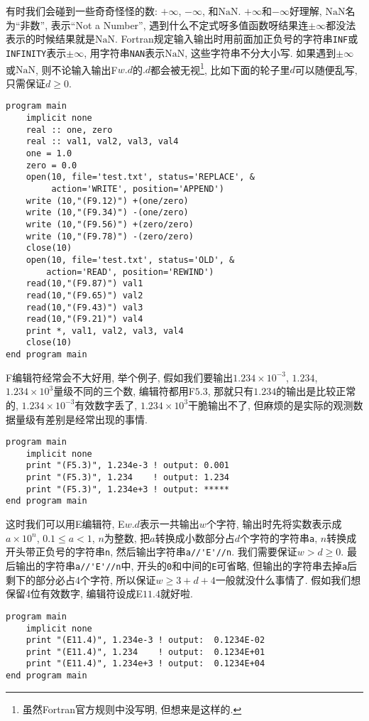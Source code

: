 有时我们会碰到一些奇奇怪怪的数: $+\infty$, $-\infty$, 和$\text{NaN}$. $+\infty$和$-\infty$好理解, $\text{NaN}$名为``非数'', 表示``Not a Number'', 遇到什么不定式呀多值函数呀结果连$\pm\infty$都没法表示的时候结果就是$\text{NaN}$. Fortran规定输入输出时用前面加正负号的字符串\verb|INF|或\verb|INFINITY|表示$\pm\infty$, 用字符串\verb|NAN|表示$\text{NaN}$, 这些字符串不分大小写. 如果遇到$\pm\infty$或$\text{NaN}$, 则不论输入输出F$w.d$的$.d$都会被无视\footnote{虽然Fortran官方规则中没写明, 但想来是这样的.\label{edit_IEEE}}, 比如下面的轮子里$d$可以随便乱写, 只需保证$d\geqslant0$.
\begin{verbatim}
program main
    implicit none
    real :: one, zero
    real :: val1, val2, val3, val4
    one = 1.0
    zero = 0.0
    open(10, file='test.txt', status='REPLACE', &
         action='WRITE', position='APPEND')
    write (10,"(F9.12)") +(one/zero)
    write (10,"(F9.34)") -(one/zero)
    write (10,"(F9.56)") +(zero/zero)
    write (10,"(F9.78)") -(zero/zero)
    close(10)
    open(10, file='test.txt', status='OLD', &
        action='READ', position='REWIND')
    read(10,"(F9.87)") val1
    read(10,"(F9.65)") val2
    read(10,"(F9.43)") val3
    read(10,"(F9.21)") val4
    print *, val1, val2, val3, val4
    close(10)
end program main
\end{verbatim}

F编辑符经常会不大好用, 举个例子, 假如我们要输出$1.234\times10^{-3}$, $1.234$, $1.234\times10^{3}$量级不同的三个数, 编辑符都用F$5.3$, 那就只有$1.234$的输出是比较正常的, $1.234\times10^{-3}$有效数字丢了, $1.234\times10^{3}$干脆输出不了, 但麻烦的是实际的观测数据量级有差别是经常出现的事情.
\begin{verbatim}
program main
    implicit none
    print "(F5.3)", 1.234e-3 ! output: 0.001
    print "(F5.3)", 1.234    ! output: 1.234
    print "(F5.3)", 1.234e+3 ! output: *****
end program main
\end{verbatim}
这时我们可以用E编辑符, E$w.d$表示一共输出$w$个字符, 输出时先将实数表示成$a\times10^{n}$, $0.1\leqslant a<1$, $n$为整数, 把$a$转换成小数部分占$d$个字符的字符串\verb|a|, $n$转换成开头带正负号的字符串\verb|n|, 然后输出字符串\verb|a//'E'//n|. 我们需要保证$w>d\geqslant0$. 最后输出的字符串\verb|a//'E'//n|中, 开头的\verb|0|和中间的\verb|E|可省略, 但输出的字符串去掉\verb|a|后剩下的部分必占4个字符, 所以保证$w\geqslant 3+d+4$一般就没什么事情了. 假如我们想保留4位有效数字, 编辑符设成E$11.4$就好啦.
\begin{verbatim}
program main
    implicit none
    print "(E11.4)", 1.234e-3 ! output:  0.1234E-02
    print "(E11.4)", 1.234    ! output:  0.1234E+01
    print "(E11.4)", 1.234e+3 ! output:  0.1234E+04
end program main
\end{verbatim}

